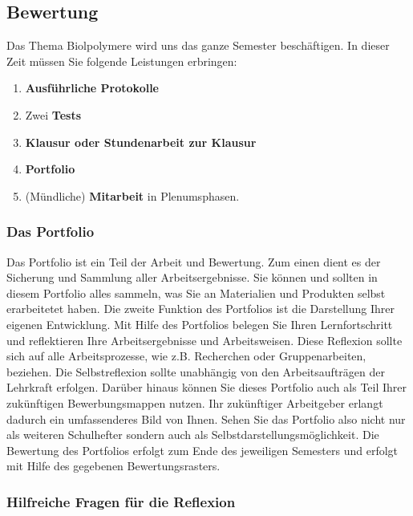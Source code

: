 \documentclass{scrartcl}  %
\begin{document}
				
				
		\subsection*{Bewertung}
			
			Das Thema Biolpolymere wird uns das ganze Semester beschäftigen. In dieser Zeit müssen Sie folgende Leistungen erbringen:
			
			\begin{enumerate}
				\item \textbf{Ausführliche Protokolle}
				\item Zwei \textbf{Tests}
				\item \textbf{Klausur oder Stundenarbeit zur Klausur}
				\item \textbf{Portfolio}
				\item (Mündliche) \textbf{Mitarbeit} in Plenumsphasen.
			\end{enumerate}
						
			\subsubsection*{Das Portfolio}
			
				Das Portfolio ist ein Teil der Arbeit und Bewertung. Zum einen dient es der Sicherung und Sammlung aller Arbeitsergebnisse. Sie können und sollten in diesem Portfolio alles sammeln, was Sie an Materialien und Produkten selbst erarbeitetet haben. 
				Die zweite Funktion des Portfolios ist die Darstellung Ihrer eigenen Entwicklung. Mit Hilfe des Portfolios belegen Sie Ihren Lernfortschritt und reflektieren Ihre Arbeitsergebnisse und  Arbeitsweisen. Diese Reflexion sollte sich  auf alle Arbeitsprozesse, wie z.B. Recherchen oder Gruppenarbeiten, beziehen. Die Selbstreflexion sollte unabhängig von den Arbeitsaufträgen der Lehrkraft erfolgen. \newline
				Darüber hinaus können Sie dieses Portfolio auch als Teil Ihrer zukünftigen Bewerbungsmappen nutzen. Ihr zukünftiger Arbeitgeber erlangt dadurch ein umfassenderes Bild von Ihnen. Sehen Sie das Portfolio also nicht nur als weiteren Schulhefter sondern auch als Selbstdarstellungsmöglichkeit. \newline
				Die Bewertung des Portfolios erfolgt zum Ende des jeweiligen Semesters und erfolgt mit Hilfe des gegebenen Bewertungsrasters.
						 
					
			\subsubsection*{Hilfreiche Fragen für die Reflexion}
					
\end{document}
